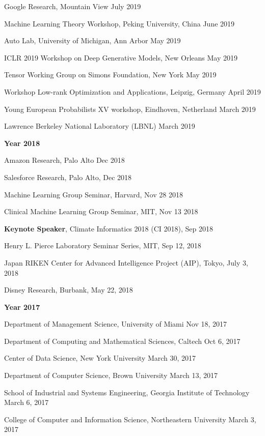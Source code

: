 \documentclass[margin,line]{res}
\begin{document}
\begin{resume}
Google  Research, Mountain View \hfill{July 2019}

Machine Learning Theory Workshop,  Peking University, China  \hfill{June 2019}

Auto Lab, University of Michigan, Ann Arbor  \hfill{May 2019}

ICLR 2019 Workshop on Deep Generative Models, New Orleans  \hfill{May 2019}

Tensor Working Group  on Simons Foundation, New York  \hfill{May  2019}

Workshop Low-rank Optimization and Applications,  Leipzig, Germany \hfill{April 2019}

 Young European Probabilists XV workshop, Eindhoven, Netherland  \hfill{March 2019}
 
 Lawrence Berkeley National Laboratory (LBNL) \hfill{March 2019}

 {\bf Year  2018}
 
Amazon Research, Palo Alto \hfill{Dec 2018}

Salesforce Research, Palo Alto, \hfill{Dec 2018}

Machine Learning Group Seminar, Harvard, \hfill {Nov 28 2018} 

Clinical Machine Learning Group Seminar, MIT, \hfill {Nov 13  2018} 


\textbf{Keynote Speaker},  Climate Informatics 2018 (CI 2018), \hfill {Sep 2018} 


Henry L. Pierce Laboratory Seminar Series, MIT, \hfill {Sep 12, 2018}

Japan RIKEN  Center for Advanced Intelligence Project (AIP), Tokyo, \hfill {July 3, 2018}

Disney Research, Burbank, \hfill {May 22, 2018}

 {\bf Year  2017}
 
Department of Management Science,  University of Miami  \hfill {Nov 18, 2017}


Department of Computing and Mathematical Sciences,  Caltech  \hfill {Oct 6, 2017}


Center of Data Science, New York University  \hfill {March 30, 2017}


Department of Computer Science, Brown University   \hfill {March 13, 2017}



School of Industrial and Systems Engineering, Georgia Institute of Technology  \hfill {March 6, 2017}


College of Computer and Information Science, Northeastern University  \hfill {March 3, 2017}



\end{resume}
\end{document}
